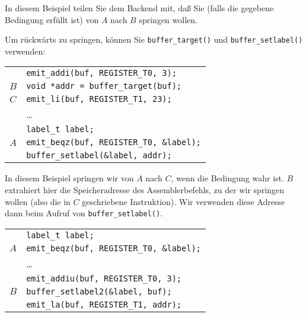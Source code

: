\documentclass[11pt,a4paper]{article}
\newcommand{\Cty}[1]{\textcolor{dblue}{\texttt{#1}}}
\begin{document}
\vspace{0.5cm}

In diesem Beispiel teilen Sie dem Backend mit, daß Sie (falls die gegebene Bedingung erfüllt ist) von $A$ nach $B$ springen wollen.

Um rückwärts zu springen, können Sie \texttt{buffer\_target()} und \texttt{buffer\_setlabel()} verwenden:

\vspace{0.5cm}

\begin{tabular}{ll}
  &\texttt{emit\_addi(buf, REGISTER\_T0, 3);} \\
  $B$&\texttt{\Cty{void *}addr = buffer\_target(buf);} \\
  $C$ &\texttt{emit\_li(buf, REGISTER\_T1, 23);} \\
  & \ldots \\
  &\texttt{\Cty{label\_t} label;}\\
  $A$&\texttt{emit\_beqz(buf, REGISTER\_T0, \&label);}\\
  & \texttt{buffer\_setlabel(\&label, addr);}\\
\end{tabular}

\vspace{0.5cm}

In diesem Beispiel springen wir von  $A$ nach $C$, wenn die Bedingung wahr ist.
$B$ extrahiert hier die Speicheradresse des Assemblerbefehls, zu der wir springen wollen (also die in $C$ geschriebene Instruktion).
Wir verwenden diese Adresse dann beim Aufruf von \texttt{buffer\_setlabel()}.




\vspace{0.5cm}

\begin{tabular}{ll}
&\texttt{\Cty{label\_t} label;}\\
$A$&\texttt{emit\_beqz(buf, REGISTER\_T0, \&label);}\\
&\ldots \\
&\texttt{emit\_addiu(buf, REGISTER\_T0, 3);} \\
$B$&\texttt{buffer\_setlabel2(\&label, buf);} \\
&\texttt{emit\_la(buf, REGISTER\_T1, addr);} \\
\end{tabular}

\vspace{0.5cm}
\end{document}
